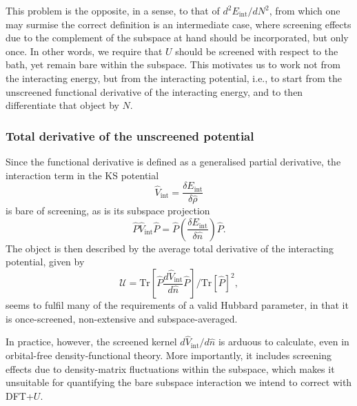 This problem is the opposite, in a sense, to that of
$ d^2E_\textrm{int}/dN^2$, 
from which one may surmise the 
correct definition is an intermediate case, 
where screening effects due to the complement 
of the subspace at hand should be incorporated, but only once.
%
In other words, we require that $U$ 
should be screened with respect to the bath, 
yet remain bare within the subspace.
%
This motivates us to work not from the interacting energy,  
but  from the interacting potential, i.e., 
to start from the unscreened functional derivative
of the interacting energy, 
and to then differentiate that object by $N$.


\subsubsection{Total derivative of the unscreened potential}

Since the functional derivative 
is defined as a generalised partial derivative, 
the interaction term in the KS potential 
%
\begin{equation}
\hat{V}_\textrm{int} = \frac{\delta E_\textrm{int}}{ \delta \hat{\rho}}
\end{equation}
%
 is bare of screening, 
 as is its subspace projection 
%
\begin{equation}
\hat{P} \hat{V}_\textrm{int} \hat{P} 
= \hat{P}\left( \frac{ \delta E_\textrm{int}}{ \delta \hat{n} }\right) \hat{P}.
\end{equation}
%
The object is then described by 
the average total derivative of 
the interacting potential, 
given by
%
\begin{equation}
\mathcal{U}=\textrm{Tr} \left[ \hat{P} \frac{d \hat{V}_\textrm{int}}{ d \hat{n}} \hat{P}\right] /
\textrm{Tr} \left[  \hat{P} \right]^{2}, 
\end{equation}
%
seems to fulfil many of the requirements 
of a valid Hubbard parameter, 
in that it is once-screened, 
non-extensive and subspace-averaged.

In practice, however, the screened kernel 
$ d \hat{V}_\textrm{int} / d \hat{n} $ 
is arduous to calculate,
even in orbital-free density-functional theory.
%
More importantly, 
it includes screening effects due to 
density-matrix fluctuations within the subspace, 
which makes it unsuitable for quantifying 
the bare subspace interaction we 
intend to correct with DFT+$U$.
%

